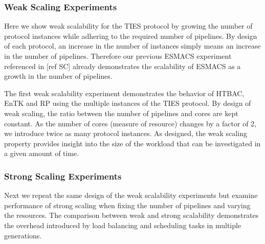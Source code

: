 \subsubsection{Weak Scaling Experiments}


Here we show weak scalability for the TIES protocol by growing the number of
protocol instances while adhering to the required number of pipelines. By
design of each protocol, an increase in the number of instances simply means
an increase in the number of pipelines. Therefore our previous ESMACS
experiment referenced in [ref SC] already demonstrates the scalability of
ESMACS as a growth in the number of pipelines.

The first weak scalability experiment demonstrates the behavior of HTBAC, EnTK
and RP using the multiple instances of the TIES protocol. By design of weak
scaling, the ratio between the number of pipelines and cores are kept
constant. As the number of
cores (measure of resource) changes by a factor of 2, we introduce twice as
many protocol instances. As designed, the weak scaling property provides
insight into the size of the workload that can be investigated in a given
amount of time.






\subsubsection {Strong Scaling Experiments}

Next we repeat the same design of the weak scalability
experiments but examine performance of strong scaling when fixing the number of
pipelines and varying the resources. The comparison between weak and strong
scalability demonstrates the overhead introduced by load balancing and
scheduling tasks in multiple generations.

